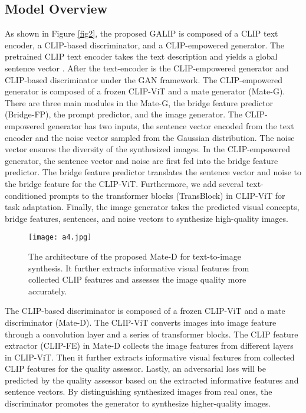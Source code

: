 \documentclass[10pt,twocolumn,letterpaper]{article}
\begin{document}
\subsection{Model Overview}

As shown in Figure \ref{fig2}, the proposed GALIP is composed of a CLIP text encoder, a CLIP-based discriminator, and a CLIP-empowered generator. 
The pretrained CLIP text encoder takes the text description and yields a global sentence vector .
After the text-encoder is the CLIP-empowered generator and CLIP-based discriminator under the GAN framework.
The CLIP-empowered generator is composed of a frozen CLIP-ViT and a mate generator (Mate-G). 
There are three main modules in the Mate-G, the bridge feature predictor (Bridge-FP), the prompt predictor, and the image generator.
The CLIP-empowered generator has two inputs, the sentence vector  encoded from the text encoder and the noise vector  sampled from the Gaussian distribution.
The noise vector ensures the diversity of the synthesized images.
In the CLIP-empowered generator, the sentence vector and noise are first fed into the bridge feature predictor.  
The bridge feature predictor translates the sentence vector and noise to the bridge feature for the CLIP-ViT.
Furthermore, we add several text-conditioned prompts to the transformer blocks (TransBlock) in CLIP-ViT for task adaptation.
Finally, the image generator takes the predicted visual concepts, bridge features, sentences, and noise vectors to synthesize high-quality images.


\begin{figure*}[t]
  \centering
  \texttt{[image: a4.jpg]}
  \caption{The architecture of the proposed Mate-D for text-to-image synthesis. It further extracts informative visual features from collected CLIP features and assesses the image quality more accurately.}
  \label{fig3}
  \vspace{-0.4cm}
\end{figure*}


The CLIP-based discriminator is composed of a frozen CLIP-ViT and a mate discriminator (Mate-D).
The CLIP-ViT converts images into image feature through a convolution layer and a series of transformer blocks.
The CLIP feature extractor (CLIP-FE) in Mate-D collects the image features from different layers in CLIP-ViT.
Then it further extracts informative visual features from collected CLIP features for the quality assessor.
Lastly, an adversarial loss will be predicted by the quality assessor based on the extracted informative features and sentence vectors.
By distinguishing synthesized images from real ones, the discriminator promotes the generator to synthesize higher-quality images.
\end{document}
